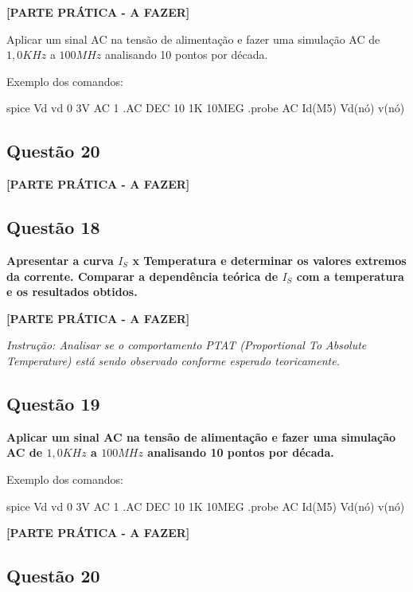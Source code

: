 \documentclass[12pt,a4paper]{article}
\begin{document}
\textbf{[PARTE PRÁTICA - A FAZER]}

Aplicar um sinal AC na tensão de alimentação e fazer uma simulação AC de $1,0 KHz$ a $100 MHz$ analisando 10 pontos por década.

Exemplo dos comandos:

\begin{codeblockm}{spice}
Vd vd 0 3V AC 1
.AC DEC 10 1K 10MEG
.probe AC Id(M5) Vd(nó) v(nó)
\end{codeblockm}

\subsection*{Questão 20}

\textbf{[PARTE PRÁTICA - A FAZER]}

\subsection*{Questão 18}

\textbf{Apresentar a curva $I_S$ x Temperatura e determinar os valores extremos da corrente. Comparar a dependência teórica de $I_S$ com a temperatura e os resultados obtidos.}

\textbf{[PARTE PRÁTICA - A FAZER]}

\textit{Instrução: Analisar se o comportamento PTAT (Proportional To Absolute Temperature) está sendo observado conforme esperado teoricamente.}

\subsection*{Questão 19}

\textbf{Aplicar um sinal AC na tensão de alimentação e fazer uma simulação AC de $1,0 KHz$ a $100 MHz$ analisando 10 pontos por década.}

Exemplo dos comandos:

\begin{codeblockm}{spice}
Vd vd 0 3V AC 1
.AC DEC 10 1K 10MEG
.probe AC Id(M5) Vd(nó) v(nó)
\end{codeblockm}

\textbf{[PARTE PRÁTICA - A FAZER]}

\subsection*{Questão 20}
\end{document}
